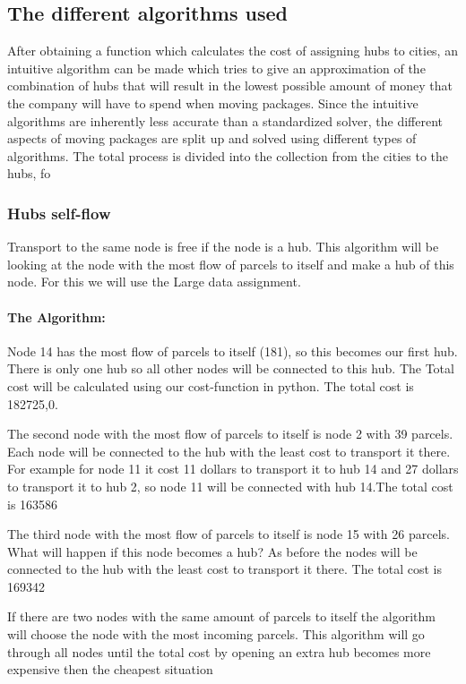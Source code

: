 \documentclass{article}
\begin{document}
        
    \subsection{The different algorithms used}
    
    After obtaining a function which calculates the cost of assigning hubs to cities, an intuitive algorithm can be made which tries to give an approximation of the combination of hubs that will result in the lowest possible amount of money that the company will have to spend when moving packages. 
    Since the intuitive algorithms are inherently less accurate than a standardized solver, the different aspects of moving packages are split up and solved using different types of algorithms. The total process is divided into the collection from the cities to the hubs, fo
    
    
    
\subsubsection{Hubs self-flow}
Transport to the same node is free if the node is a hub. This algorithm will be looking at the node with the most flow of parcels to itself and make a hub of this node. For this we will use the Large data assignment.
\paragraph{The Algorithm:}
Node 14 has the most flow of parcels to itself (181), so this becomes our first hub. There is only one hub so all other nodes will be connected to this hub. The Total cost will be calculated using our cost-function in python.
The total cost is 182725,0.

The second node with the most flow of parcels to itself is node 2 with 39 parcels. Each node will be connected to the hub with the least cost to transport it there. For example for node 11 it cost 11 dollars to transport it to hub 14 and 27 dollars to transport it to hub 2, so node 11 will be connected with hub 14.The total cost is 163586

The third node with the most flow of parcels to itself is node 15 with 26 parcels. What will happen if this node becomes a hub? As before the nodes will be connected to the hub with the least cost to transport it there. The total cost is 169342
 
If there are two nodes with the same amount of parcels to itself the algorithm will choose the node with the most incoming parcels. This algorithm will go through all nodes until the total cost by opening an extra hub becomes more expensive then the cheapest situation
\end{document}
